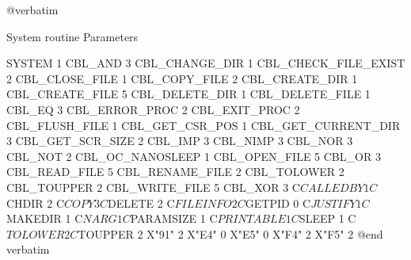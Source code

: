@verbatim

System routine			Parameters

SYSTEM				1
CBL_AND				3
CBL_CHANGE_DIR			1
CBL_CHECK_FILE_EXIST		2
CBL_CLOSE_FILE			1
CBL_COPY_FILE			2
CBL_CREATE_DIR			1
CBL_CREATE_FILE			5
CBL_DELETE_DIR			1
CBL_DELETE_FILE			1
CBL_EQ				3
CBL_ERROR_PROC			2
CBL_EXIT_PROC			2
CBL_FLUSH_FILE			1
CBL_GET_CSR_POS			1
CBL_GET_CURRENT_DIR		3
CBL_GET_SCR_SIZE		2
CBL_IMP				3
CBL_NIMP			3
CBL_NOR				3
CBL_NOT				2
CBL_OC_NANOSLEEP		1
CBL_OPEN_FILE			5
CBL_OR				3
CBL_READ_FILE			5
CBL_RENAME_FILE			2
CBL_TOLOWER			2
CBL_TOUPPER			2
CBL_WRITE_FILE			5
CBL_XOR				3
C$CALLEDBY			1
C$CHDIR				2
C$COPY				3
C$DELETE			2
C$FILEINFO			2
C$GETPID			0
C$JUSTIFY			1
C$MAKEDIR			1
C$NARG				1
C$PARAMSIZE			1
C$PRINTABLE			1
C$SLEEP				1
C$TOLOWER			2
C$TOUPPER			2
X"91"				2
X"E4"				0
X"E5"				0
X"F4"				2
X"F5"				2
@end verbatim

